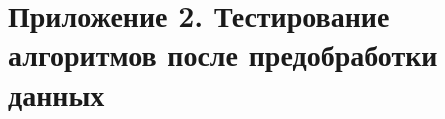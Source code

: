 \newpage
\section*{Приложение 2. Тестирование алгоритмов после предобработки данных}

\begin{center}
\end{center}





\newpage



